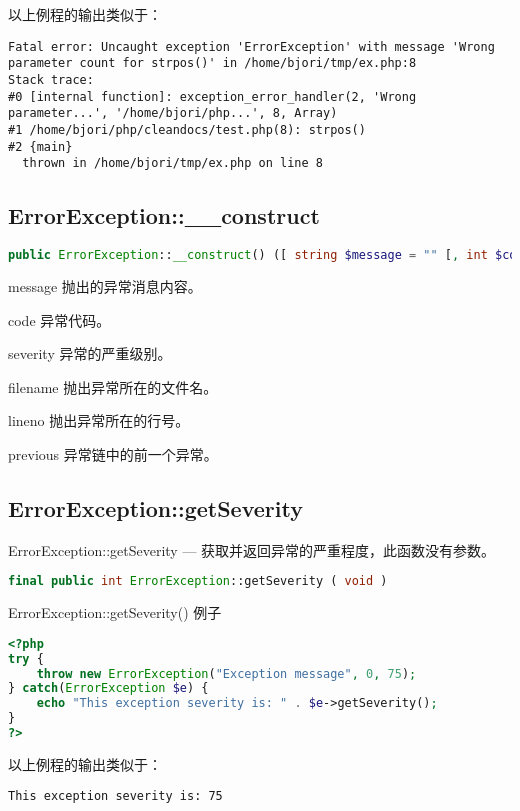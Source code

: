以上例程的输出类似于：

\begin{verbatim}
Fatal error: Uncaught exception 'ErrorException' with message 'Wrong parameter count for strpos()' in /home/bjori/tmp/ex.php:8
Stack trace:
#0 [internal function]: exception_error_handler(2, 'Wrong parameter...', '/home/bjori/php...', 8, Array)
#1 /home/bjori/php/cleandocs/test.php(8): strpos()
#2 {main}
  thrown in /home/bjori/tmp/ex.php on line 8
\end{verbatim}



\subsection{ErrorException::\_\_construct}




\begin{lstlisting}[language=PHP]
public ErrorException::__construct() ([ string $message = "" [, int $code = 0 [, int $severity = 1 [, string $filename = __FILE__ [, int $lineno = __LINE__ [, Exception $previous = NULL ]]]]]] )
\end{lstlisting}

\begin{compactitem}
\item message
抛出的异常消息内容。
\item code
异常代码。
\item severity
异常的严重级别。
\item filename
抛出异常所在的文件名。
\item lineno
抛出异常所在的行号。
\item previous
异常链中的前一个异常。
\end{compactitem}


\subsection{ErrorException::getSeverity}

ErrorException::getSeverity — 获取并返回异常的严重程度，此函数没有参数。


\begin{lstlisting}[language=PHP]
final public int ErrorException::getSeverity ( void )
\end{lstlisting}


\begin{example}
ErrorException::getSeverity() 例子
\begin{lstlisting}[language=PHP]
<?php
try {
    throw new ErrorException("Exception message", 0, 75);
} catch(ErrorException $e) {
    echo "This exception severity is: " . $e->getSeverity();
}
?>
\end{lstlisting}
\end{example}

以上例程的输出类似于：

\begin{verbatim}
This exception severity is: 75
\end{verbatim}











\clearpage
